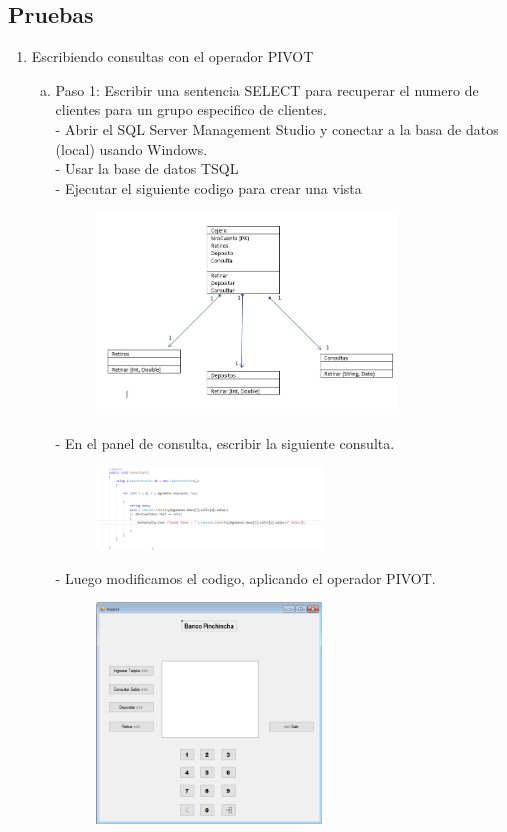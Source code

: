 \subsection{Pruebas}
\begin{enumerate}[1.]
	\item Escribiendo consultas con el operador PIVOT
	\begin{enumerate}[a)]
	\item Paso 1: Escribir una sentencia SELECT para recuperar el numero de clientes para un grupo especifico de clientes.\\
		-  Abrir el SQL Server Management Studio y conectar a la basa de datos (local) usando Windows.\\
		-  Usar la base de datos TSQL\\
		-  Ejecutar el siguiente codigo para crear una vista\\
		\begin{figure}[H]
		\begin{center}
		\includegraphics[width=8cm]{./Imagenes/img1}
		\end{center}
		\end{figure}
		-  En el panel de consulta, escribir la siguiente consulta.
		\begin{figure}[H]
		\begin{center}
		\includegraphics[width=6cm]{./Imagenes/img16}
		\end{center}
		\end{figure}
		-  Luego modificamos el codigo, aplicando el operador PIVOT.
		\begin{figure}[H]
		\begin{center}
		\includegraphics[width=6cm]{./Imagenes/img2}

\end{center}
\end{figure}
\end{enumerate}
\end{enumerate}
